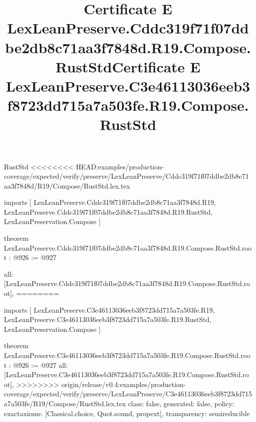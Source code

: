 \begin{lexlean}{RustStd}
<<<<<<<< HEAD:examples/production-coverage/expected/verify/preserve/LexLeanPreserve/Cddc319f71f07ddbe2db8c71aa3f7848d/R19/Compose/RustStd.lex.tex
\title{Certificate E LexLeanPreserve.Cddc319f71f07ddbe2db8c71aa3f7848d.R19.Compose.RustStd}
\begin{coremodule}
imports [
  LexLeanPreserve.Cddc319f71f07ddbe2db8c71aa3f7848d.R19,
  LexLeanPreserve.Cddc319f71f07ddbe2db8c71aa3f7848d.R19.RustStd,
  LexLeanPreservation.Compose
]

theorem LexLeanPreserve.Cddc319f71f07ddbe2db8c71aa3f7848d.R19.Compose.RustStd.root : @926 := @927 {
  all: [LexLeanPreserve.Cddc319f71f07ddbe2db8c71aa3f7848d.R19.Compose.RustStd.root],
========
\title{Certificate E LexLeanPreserve.C3e46113036eeb3f8723dd715a7a503fe.R19.Compose.RustStd}
\begin{coremodule}
imports [
  LexLeanPreserve.C3e46113036eeb3f8723dd715a7a503fe.R19,
  LexLeanPreserve.C3e46113036eeb3f8723dd715a7a503fe.R19.RustStd,
  LexLeanPreservation.Compose
]

theorem LexLeanPreserve.C3e46113036eeb3f8723dd715a7a503fe.R19.Compose.RustStd.root : @926 := @927 {
  all: [LexLeanPreserve.C3e46113036eeb3f8723dd715a7a503fe.R19.Compose.RustStd.root],
>>>>>>>> origin/release/v0.4:examples/production-coverage/expected/verify/preserve/LexLeanPreserve/C3e46113036eeb3f8723dd715a7a503fe/R19/Compose/RustStd.lex.tex
  class: false,
  generated: false,
  policy: exact{axioms: [Classical.choice, Quot.sound, propext]},
  transparency: semireducible
}


\end{coremodule}}
\end{coremodule}
\end{lexlean}
